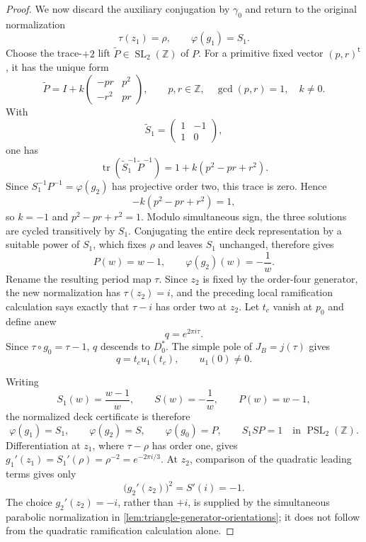 \begin{proof}
We now discard the auxiliary conjugation by \(\gamma_0\) and return to the
original normalization
\[
 \tau(z_1)=\rho,\qquad \varphi(g_1)=S_1.
\]
Choose the trace-\(+2\) lift
\(\widetilde P\in\operatorname{SL}_2(\mathbb Z)\) of \(P\).  For a
primitive fixed vector \((p,r)^{\mathsf t}\), it has the unique form
\[
 \widetilde P
 =I+k\begin{pmatrix}-pr&p^2\\-r^2&pr\end{pmatrix},
 \qquad p,r\in\mathbb Z,\quad \gcd(p,r)=1,\quad k\ne0.
\]
With
\[
 \widetilde S_1=\begin{pmatrix}1&-1\\1&0\end{pmatrix},
\]
one has
\[
 \operatorname{tr}(\widetilde S_1^{-1}\widetilde P^{-1})
 =1+k(p^2-pr+r^2).
\]
Since \(S_1^{-1}P^{-1}=\varphi(g_2)\) has projective order two, this trace
is zero.  Hence
\[
 -k(p^2-pr+r^2)=1,
\]
so \(k=-1\) and \(p^2-pr+r^2=1\).  Modulo simultaneous sign, the three
solutions are cycled transitively by \(S_1\).  Conjugating the entire deck
representation by a suitable power of \(S_1\), which fixes \(\rho\) and
leaves \(S_1\) unchanged, therefore gives
\[
 P(w)=w-1,\qquad \varphi(g_2)(w)=-\frac1w.
\]
Rename the resulting period map \(\tau\).  Since \(z_2\) is fixed by the
order-four generator, the new normalization has \(\tau(z_2)=i\), and the
preceding local ramification calculation says exactly that \(\tau-i\) has
order two at \(z_2\).  Let \(t_c\) vanish at \(p_0\) and define anew
\[
 q=e^{2\pi i\tau}.
\]
Since \(\tau\circ g_0=\tau-1\), \(q\) descends to \(D_0^*\).  The simple
pole of \(J_B=j(\tau)\) gives
\[
 q=t_cu_1(t_c),\qquad u_1(0)\ne0.
\]

Writing
\[
 S_1(w)=\frac{w-1}{w},\qquad S(w)=-\frac1w,
 \qquad P(w)=w-1,
\]
the normalized deck certificate is therefore
\begin{equation}
 \varphi(g_1)=S_1,\qquad
 \varphi(g_2)=S,\qquad
 \varphi(g_0)=P,\qquad
 S_1SP=1
 \quad\text{in }\operatorname{PSL}_2(\mathbb Z).
\label{eq:period-deck-certificate}
\end{equation}
Differentiation at \(z_1\), where \(\tau-\rho\) has order one, gives
\(g_1'(z_1)=S_1'(\rho)=\rho^{-2}=e^{-2\pi i/3}\).  At \(z_2\), comparison
of the quadratic leading terms gives only
\[
 \bigl(g_2'(z_2)\bigr)^2=S'(i)=-1.
\]
The choice \(g_2'(z_2)=-i\), rather than \(+i\), is supplied by the
simultaneous parabolic normalization in
\cref{lem:triangle-generator-orientations}; it does not follow from the
quadratic ramification calculation alone.


\end{proof}
